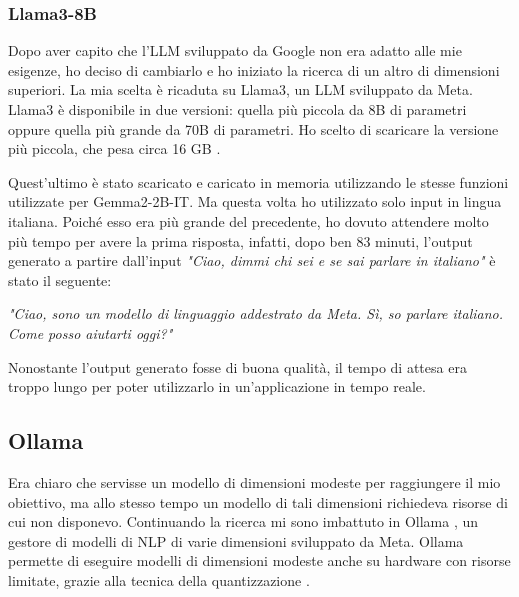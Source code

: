 \subsubsection{Llama3-8B}
Dopo aver capito che l'LLM sviluppato da Google non era adatto alle mie esigenze, ho deciso di cambiarlo e ho iniziato la ricerca di un altro di dimensioni superiori. La mia scelta è ricaduta su Llama3, un LLM sviluppato da Meta. Llama3 è disponibile in due versioni: quella più piccola da 8B di parametri oppure quella più grande da 70B di parametri. Ho scelto di scaricare la versione più piccola, che pesa circa 16 GB \cite{llama38b}.

Quest'ultimo è stato scaricato e caricato in memoria utilizzando le stesse funzioni utilizzate per Gemma2-2B-IT. Ma questa volta ho utilizzato solo input in lingua italiana. Poiché esso era più grande del precedente, ho dovuto attendere molto più tempo per avere la prima risposta, infatti, dopo ben 83 minuti, l'output generato a partire dall'input \textit{"Ciao, dimmi chi sei e se sai parlare in italiano"} è stato il seguente:
\begin{center}
    \textit{"Ciao, sono un modello di linguaggio addestrato da Meta. Sì, so parlare italiano. Come posso aiutarti oggi?"}
\end{center}
Nonostante l'output generato fosse di buona qualità, il tempo di attesa era troppo lungo per poter utilizzarlo in un'applicazione in tempo reale.

\subsection{Ollama}
Era chiaro che servisse un modello di dimensioni modeste per raggiungere il mio obiettivo, ma allo stesso tempo un modello di tali dimensioni richiedeva risorse di cui non disponevo. Continuando la ricerca mi sono imbattuto in Ollama \cite{ollamasite,ollamagithub}, un gestore di modelli di NLP di varie dimensioni sviluppato da Meta. Ollama permette di eseguire modelli di dimensioni modeste anche su hardware con risorse limitate, grazie alla tecnica della quantizzazione \cite{quantization}.

